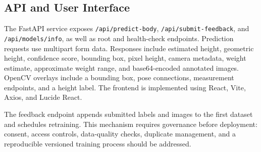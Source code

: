 \documentclass[conference]{IEEEtran}
\begin{document}
\subsection{API and User Interface}
The FastAPI service exposes \texttt{/api/predict-body}, \texttt{/api/submit-feedback}, and \texttt{/api/models/info}, as well as root and health-check endpoints. Prediction requests use multipart form data. Responses include estimated height, geometric height, confidence score, bounding box, pixel height, camera metadata, weight estimate, approximate weight range, and base64-encoded annotated images. OpenCV overlays include a bounding box, pose connections, measurement endpoints, and a height label. The frontend is implemented using React, Vite, Axios, and Lucide React.

The feedback endpoint appends submitted labels and images to the first dataset and schedules retraining. This mechanism requires governance before deployment: consent, access controls, data-quality checks, duplicate management, and a reproducible versioned training process should be addressed.
\end{document}
